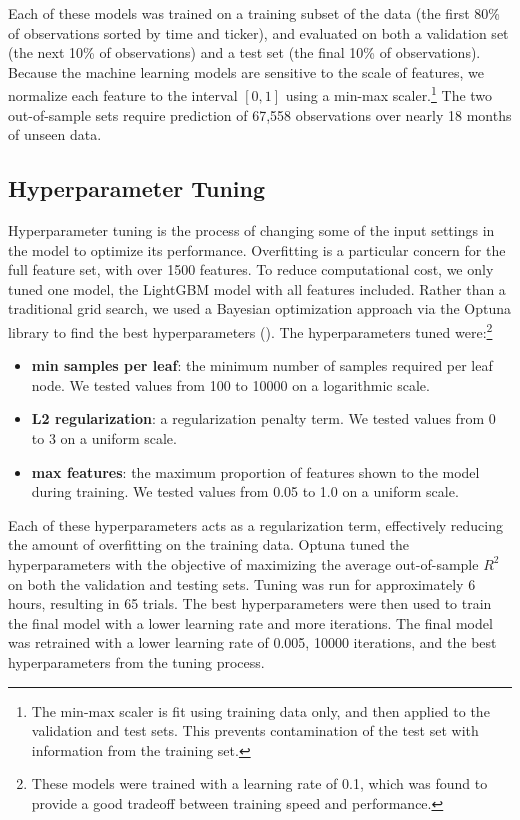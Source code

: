 \documentclass[12pt]{article}
\begin{document}
Each of these models was trained on a training subset of the data (the first 80\% of observations sorted by time and ticker), and evaluated on both a validation set (the next 10\% of observations) and a test set (the final 10\% of observations). Because the machine learning models are sensitive to the scale of features, we normalize each feature to the interval $[0,1]$ using a min-max scaler.\footnote{The min-max scaler is fit using training data only, and then applied to the validation and test sets. This prevents contamination of the test set with information from the training set.} The two out-of-sample sets require prediction of 67,558 observations over nearly 18 months of unseen data.

\subsection{Hyperparameter Tuning}
Hyperparameter tuning is the process of changing some of the input settings in the model to optimize its performance. Overfitting is a particular concern for the full feature set, with over 1500 features. To reduce computational cost, we only tuned one model, the LightGBM model with all features included. Rather than a traditional grid search, we used a Bayesian optimization approach via the Optuna library to find the best hyperparameters (\textcite{optuna_2019}). The hyperparameters tuned were:\footnote{These models were trained with a learning rate of 0.1, which was found to provide a good tradeoff between training speed and performance.}
\begin{itemize}
\singlespacing
    \item \textbf{min samples per leaf}: the minimum number of samples required per leaf node. We tested values from 100 to 10000 on a logarithmic scale.
    \item \textbf{L2 regularization}: a regularization penalty term. We tested values from 0 to 3 on a uniform scale.
    \item \textbf{max features}: the maximum proportion of features shown to the model during training. We tested values from 0.05 to 1.0 on a uniform scale.
\end{itemize}
Each of these hyperparameters acts as a regularization term, effectively reducing the amount of overfitting on the training data. Optuna tuned the hyperparameters with the objective of maximizing the average out-of-sample $R^2$ on both the validation and testing sets. Tuning was run for approximately 6 hours, resulting in 65 trials. The best hyperparameters were then used to train the final model with a lower learning rate and more iterations. The final model was retrained with a lower learning rate of 0.005, 10000 iterations, and the best hyperparameters from the tuning process.
\end{document}

